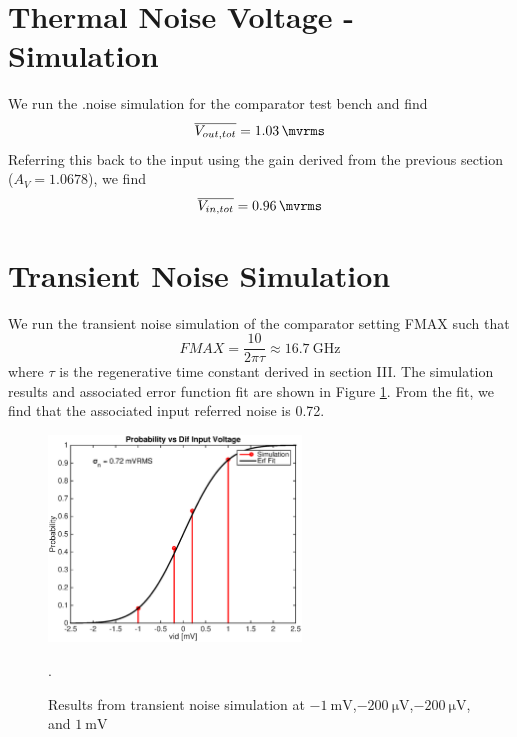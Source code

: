 \documentclass[letterpaper, notitlepage]{revtex4-1}
\begin{document}
\section{Thermal Noise Voltage - Simulation}
We run the .noise simulation for the comparator test bench and find
\begin{equation}
\overline{V_{out,tot}}=\SI{1.03}{\mvrms}
\end{equation}
Referring this back to the input using the gain derived from the previous section ($A_V=1.0678$), we find
\begin{equation}
\overline{V_{in,tot}}=\SI{0.96}{\mvrms}
\end{equation}


\section{Transient Noise Simulation}
We run the transient noise simulation of the comparator setting FMAX such that
\begin{equation}
FMAX=\frac{10}{2\pi\tau}\approx\SI{16.7}{\giga\hertz}
\end{equation}
where $\tau$ is the regenerative time constant derived in section III. The simulation results and associated error function fit are shown in Figure \ref{fig:TransientNoise}. From the fit, we find that the associated input referred noise is \SI{0.72}{\mvrms}.

\begin{figure}[h]
\begin{center}
\includegraphics[width=0.6\textwidth]{Part_G.eps}
\caption{Results from transient noise simulation at $\SI{-1}{\milli\volt}$,$\SI{-200}{\micro\volt}$,$\SI{-200}{\micro\volt}$, and $\SI{1}{\milli\volt}$}. 
\label{fig:TransientNoise}
\end{center}
\end{figure}
\end{document}
